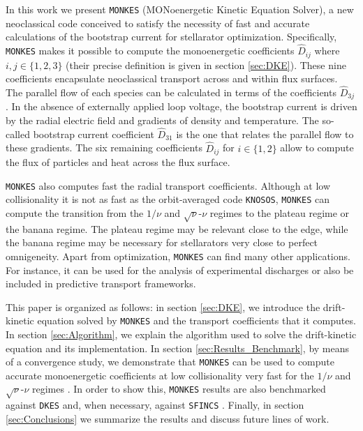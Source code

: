 \documentclass[10pt]{iopart}
\newcommand{\MONKES}{{\texttt{MONKES}}}
\newcommand{\DKES}{{\texttt{DKES}}}
\begin{document}
In this work we present {\MONKES} (MONoenergetic Kinetic Equation Solver), a new neoclassical code conceived to satisfy the necessity of fast and accurate calculations of the bootstrap current for stellarator optimization. Specifically, {\MONKES} makes it possible to compute the monoenergetic coefficients $\widehat{D}_{ij}$ where $i,j\in\{1,2,3\}$ (their precise definition is given in section \ref{sec:DKE}). These nine coefficients encapsulate neoclassical transport across and within flux surfaces. The parallel flow of each species can be calculated in terms of the coefficients $\widehat{D}_{3j}$ \cite{Taguchi,Sugama-PENTA,Sugama2008,MaasbergMomentumCorrection}. In the absence of externally applied loop voltage, the bootstrap current is driven by the radial electric field and gradients of density and temperature. The so-called bootstrap current coefficient $\widehat{D}_{31}$ is the one that relates the parallel flow to these gradients. The six remaining coefficients $\widehat{D}_{ij}$ for $i\in\{1,2\}$ allow to compute the flux of particles and heat across the flux surface. 

{\MONKES} also computes fast the radial transport coefficients. Although at low collisionality it is not as fast as the orbit-averaged code \texttt{KNOSOS}, {\MONKES} can compute the transition from the $1/\nu$ and $\sqrt{\nu}$-$\nu$ regimes to the plateau regime or the banana regime. The plateau regime may be relevant close to the edge, while the banana regime may be necessary for stellarators very close to perfect omnigeneity. Apart from optimization, {\MONKES} can find many other applications. For instance, it can be used for the analysis of experimental discharges or also be included in predictive transport frameworks.


This paper is organized as follows: in section \ref{sec:DKE}, we introduce the drift-kinetic equation solved by {\MONKES} and the transport coefficients that it computes. In section \ref{sec:Algorithm}, we explain the algorithm used to solve the drift-kinetic equation and its implementation. In section \ref{sec:Results_Benchmark}, by means of a convergence study, we demonstrate that {\MONKES} can be used to compute accurate monoenergetic coefficients at low collisionality very fast for the $1/\nu$ and $\sqrt{\nu}$-$\nu$ regimes \cite{dherbemont2022}. In order to show this, {\MONKES} results are also benchmarked against {\DKES} \cite{DKES1986,VanRij_1989} and, when necessary, against {\texttt{SFINCS}} \cite{Landreman_2014}. Finally, in section \ref{sec:Conclusions} we summarize the results and discuss future lines of work.
\end{document}
